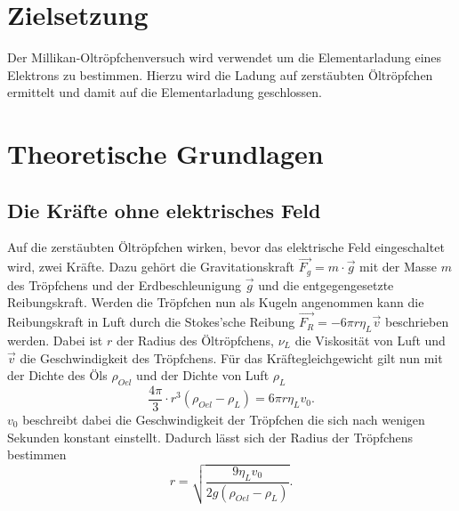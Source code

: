 \section{Zielsetzung}
\label{sec:ziel}
Der Millikan-Oltröpfchenversuch wird verwendet um die Elementarladung eines Elektrons zu bestimmen.
Hierzu wird die Ladung auf zerstäubten Öltröpfchen ermittelt und damit auf die Elementarladung geschlossen.
\section{Theoretische Grundlagen}
\label{sec:theorie}
\subsection{Die Kräfte ohne elektrisches Feld}
\label{ssec:th_ohne}
Auf die zerstäubten Öltröpfchen wirken, bevor das elektrische Feld eingeschaltet wird, zwei Kräfte.
Dazu gehört die Gravitationskraft $\overrightarrow{F_g}=m\cdot \overrightarrow{g}$ mit der Masse $m$ des Tröpfchens und der Erdbeschleunigung $\overrightarrow{g}$ und
die entgegengesetzte Reibungskraft. Werden die Tröpfchen nun als Kugeln angenommen kann die Reibungskraft in Luft durch die Stokes'sche Reibung  $\overrightarrow{F_R}=-6\pi r \eta_L \overrightarrow{v} $ beschrieben werden.
Dabei ist $r$ der Radius des Öltröpfchens, $\nu_L$ die Viskosität von Luft und $\overrightarrow{v} $ die Geschwindigkeit des Tröpfchens.
Für das Kräftegleichgewicht gilt nun mit der Dichte des Öls $\rho_{Oel}$ und der Dichte von Luft $\rho_{L}$
\begin{equation*}
    \frac{4\pi}{3}\cdot r^3\left(\rho_{Oel}-\rho_{L}\right)=6\pi r \eta_L v_0.
\end{equation*}
$v_0$ beschreibt dabei die Geschwindigkeit der Tröpfchen die sich nach wenigen Sekunden konstant einstellt.
Dadurch lässt sich der Radius der Tröpfchens bestimmen
\begin{equation}
    \label{eqn:radius1}
    r=\sqrt{\frac{9 \eta_L v_0}{2 g \left(\rho_{Oel}-\rho_{L}\right)}}.
\end{equation}
